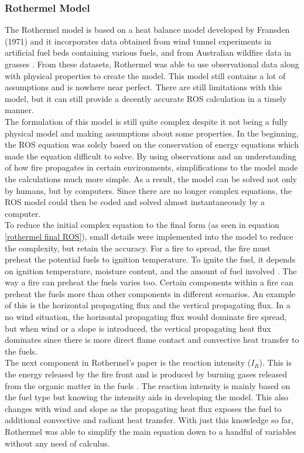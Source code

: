 \documentclass{article}
\begin{document}
\subsubsection{Rothermel Model}

The Rothermel model is based on a heat balance model developed by Fransden (1971) and it incorporates data obtained from wind tunnel experiments in artificial fuel beds containing various fuels, and from Australian wildfire data in grasses \citep{Anderson2010}. From these datasets, Rothermel was able to use observational data along with physical properties to create the model. This model still contains a lot of assumptions and is nowhere near perfect. There are still limitations with this model, but it can still provide a decently accurate ROS calculation in a timely manner. \\
\indent The formulation of this model is still quite complex despite it not being a fully physical model and making assumptions about some properties. In the beginning, the ROS equation was solely based on the conservation of energy equations which made the equation difficult to solve. By using observations and an understanding of how fire propagates in certain environments, simplifications to the model made the calculations much more simple. As a result, the model can be solved not only by humans, but by computers. Since there are no longer complex equations, the ROS model could then be coded and solved almost instantaneously by a computer. \\
\indent To reduce the initial complex equation to the final form (as seen in equation \ref{rothermel final ROS}), small details were implemented into the model to reduce the complexity, but retain the accuracy. For a fire to spread, the fire must preheat the potential fuels to ignition temperature. To ignite the fuel, it depends on ignition temperature, moisture content, and the amount of fuel involved \citep{Rothermel1972}. The way a fire can preheat the fuels varies too. Certain components within a fire can preheat the fuels more than other components in different scenarios. An example of this is the horizontal propagating flux and the vertical propagating flux. In a no wind situation, the horizontal propagating flux would dominate fire spread, but when wind or a slope is introduced, the vertical propagating heat flux dominates since there is more direct flame contact and convective heat transfer to the fuels. \\
\indent The next component in Rothermel’s paper is the reaction intensity ($I_R$). This is the energy released by the fire front and is produced by burning gases released from the organic matter in the fuels \citep{Rothermel1972}. The reaction intensity is mainly based on the fuel type but knowing the intensity aids in developing the model. This also changes with wind and slope as the propagating heat flux exposes the fuel to additional convective and radiant heat transfer. With just this knowledge so far, Rothermel was able to simplify the main equation down to a handful of variables without any need of calculus.\\
\end{document}
